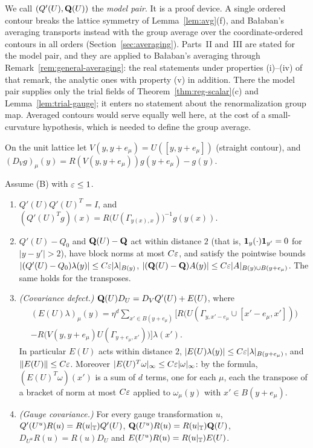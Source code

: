 We call $(Q'(U),\mathbf Q(U))$ the \emph{model pair}. It is a proof device. A single ordered contour breaks the lattice symmetry of Lemma~\ref{lem:avg}(f), and Ba\l aban's averaging transports instead with the group average over the coordinate-ordered contours in all orders (Section~\ref{sec:averaging}). Parts~II and~III are stated for the model pair, and they are applied to Ba\l aban's averaging through Remark~\ref{rem:general-averaging}: the real statements under properties (i)--(iv) of that remark, the analytic ones with property (v) in addition. There the model pair supplies only the trial fields of Theorem~\ref{thm:reg-scalar}(c) and Lemma~\ref{lem:trial-gauge}; it enters no statement about the renormalization group map. Averaged contours would serve equally well here, at the cost of a small-curvature hypothesis, which is needed to define the group average.

On the unit lattice let $V(y,y+e_\mu)=U([y,y+e_\mu])$ (straight contour), and $(D_Vg)_\mu(y)=R(V(y,y+e_\mu))g(y+e_\mu)-g(y)$.

\begin{lemma}\label{lem:cov-avg}
Assume (B) with $\varepsilon\le1$.
\begin{enumerate}[label=(\alph*)]
\item $Q'(U)Q'(U)^T=I$, and $(Q'(U)^Tg)(x)=R\big(U(\Gamma_{y(x),x})\big)^{-1}g(y(x))$.
\item $Q'(U)-Q_0$ and $\mathbf Q(U)-\mathbf Q$ act within distance $2$ (that is, $\mathbf 1_y(\cdot)\mathbf 1_{y'}=0$ for $|y-y'|>2$), have block norms at most $C\varepsilon$, and satisfy the pointwise bounds $|(Q'(U)-Q_0)\lambda(y)|\le C\varepsilon|\lambda|_{B(y)}$, $|(\mathbf Q(U)-\mathbf Q)A(y)|\le C\varepsilon|A|_{B(y)\cup B(y+e_\mu)}$. The same holds for the transposes.
\item \emph{(Covariance defect.)} $\mathbf Q(U)D_U=D_VQ'(U)+E(U)$, where
\begin{multline*}
(E(U)\lambda)_\mu(y)=\eta^d\sum_{x'\in B(y+e_\mu)}\Big[R\big(U(\Gamma_{y,x'-e_\mu}\cup[x'-e_\mu,x'])\big)\\
-R\big(V(y,y+e_\mu)U(\Gamma_{y+e_\mu,x'})\big)\Big]\lambda(x').
\end{multline*}
In particular $E(U)$ acts within distance $2$, $|E(U)\lambda(y)|\le C\varepsilon|\lambda|_{B(y+e_\mu)}$, and $\|E(U)\|\le C\varepsilon$. Moreover $|E(U)^T\omega|_\infty\le C\varepsilon|\omega|_\infty$: by the formula, $(E(U)^T\omega)(x')$ is a sum of $d$ terms, one for each $\mu$, each the transpose of a bracket of norm at most $C\varepsilon$ applied to $\omega_\mu(y)$ with $x'\in B(y+e_\mu)$.
\item \emph{(Gauge covariance.)} For every gauge transformation $u$, $Q'(U^u)R(u)=R(u|_\mathbb T)Q'(U)$, $\mathbf Q(U^u)R(u)=R(u|_\mathbb T)\mathbf Q(U)$, $D_{U^u}R(u)=R(u)D_U$ and $E(U^u)R(u)=R(u|_\mathbb T)E(U)$.
\end{enumerate}
\end{lemma}

